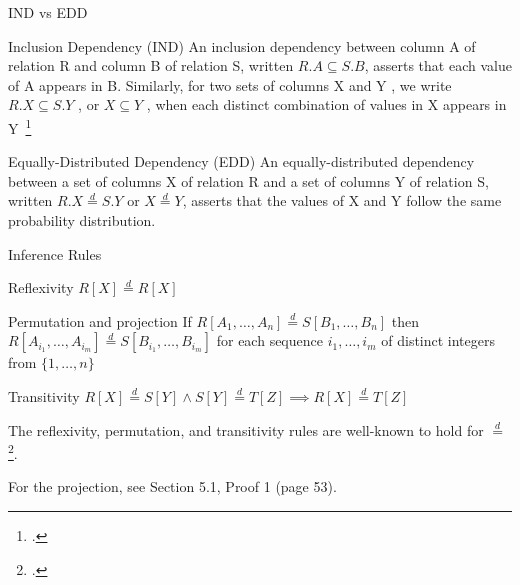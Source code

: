 \documentclass[10pt]{beamer}
\newcommand{\eqdist}{\stackrel{d}{=}}
\begin{document}
\begin{frame}{IND vs EDD}
    \begin{block}{Inclusion Dependency (IND)}
        \smallskip
        An inclusion dependency between column A of relation
        R and column B of relation S, written $R.A \subseteq S.B$, asserts that each
        value of A appears in B. Similarly, for two sets of columns X
        and Y , we write $R.X \subseteq S.Y$ , or $X \subseteq Y$ , when each distinct
        combination of values in X appears in Y~\footcite{abedjan2015}
    \end{block}
    \begin{block}{\alert{Equally-Distributed Dependency (EDD)}}
        \smallskip
        An equally-distributed dependency between a set of columns X
        of relation R and a set of columns Y of relation S, written $R.X \eqdist S.Y$ or
        $X \eqdist Y$, asserts that the values of X and Y follow the same probability distribution.
    \end{block}

\end{frame}

\begin{frame}{Inference Rules}
    \begin{block}{Reflexivity}
        $R[X] \eqdist R[X]$
    \end{block}
    \begin{block}{Permutation and \alert{projection}}
        If $R[A_1,\dots,A_n] \eqdist S[B_1,\dots,B_n]$ then
        $R[A_{i_1},\dots,A_{i_m}] \eqdist S[B_{i_1},\dots,B_{i_m}]$ for each sequence
        $i_1,\dots,i_m$ of distinct integers from $\{1,\dots,n\}$
    \end{block}
    \begin{block}{Transitivity}
        $ R[X] \eqdist S[Y] \land S[Y] \eqdist T[Z] \implies R[X] \eqdist T[Z]$
    \end{block}
    
    \begin{block}{}
    The reflexivity, permutation, and transitivity rules are well-known to hold
    for $\eqdist$ \footcite{randles1979introduction}.

    For the projection, see \alert{Section 5.1, Proof 1} (page 53).
    \end{block}

\end{frame}
\end{document}

